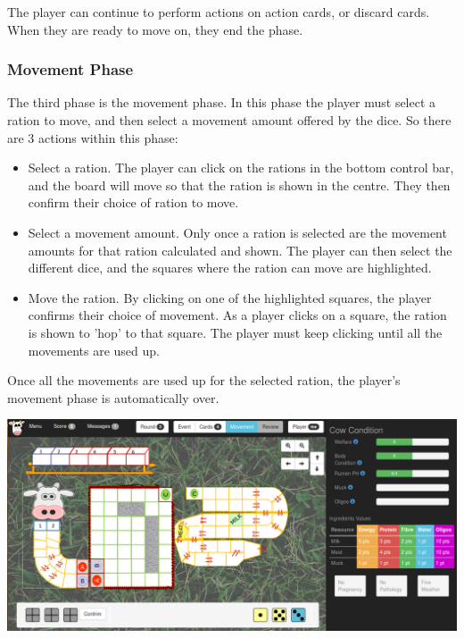 The player can continue to perform actions on action cards, or discard cards. When they are ready to move on, they end the phase.

\subsubsection{Movement Phase}
The third phase is the movement phase. In this phase the player must select a ration to move, and then select a movement amount offered by the dice. So there are 3 actions within this phase:
\begin{itemize}
	\item Select a ration. The player can click on the rations in the bottom control bar, and the board will move so that the ration is shown in the centre. They then confirm their choice of ration to move.
	\item Select a movement amount. Only once a ration is selected are the movement amounts for that ration calculated and shown. The player can then select the different dice, and the squares where the ration can move are highlighted.
	\item Move the ration. By clicking on one of the highlighted squares, the player confirms their choice of movement. As a player clicks on a square, the ration is shown to 'hop' to that square. The player must keep clicking until all the movements are used up.
\end{itemize}
Once all the movements are used up for the selected ration, the player's movement phase is automatically over.
\begin{center}
	\includegraphics[width=\textwidth]{Images/app3/ui-phase-move}
\end{center}

